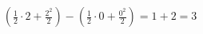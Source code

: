 \documentclass[preview]{standalone}
\begin{document}
\begin{align*}
\left( \frac{1}{2} \cdot 2 + \frac{2^2}{2} \right) - \left( \frac{1}{2} \cdot 0 + \frac{0^2}{2} \right) = 1 + 2 = 3
\end{align*}
\end{document}
